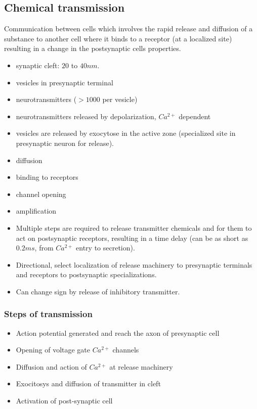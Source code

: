 \documentclass[main]{subfiles}
\begin{document}
\subsection{Chemical transmission}
Communication between cells which involves the rapid release and diffusion of a substance to another cell where it binds to a receptor (at a localized site) resulting in a change in the postsynaptic cells properties.

\begin{itemize}
\item synaptic cleft: $20$ to $40nm$.
\item vesicles in presynaptic terminal
\item neurotransmitters ($>1000$ per vesicle)
\item neurotransmitters released by depolarization, $Ca^{2+}$ dependent
\item vesicles are released by exocytose in the active zone (specialized site in presynaptic neuron for release).
\item diffusion
\item binding to receptors
\item channel opening
\item amplification
\item Multiple steps are required to release transmitter chemicals and for them to act on postsynaptic receptors, resulting in a time delay (can be as short as $0.2 ms$, from $Ca^{2+}$ entry to secretion).
\item Directional, select localization of release machinery to presynaptic terminals and receptors to postsynaptic specializations. 
\item Can change sign by release of inhibitory transmitter.
\end{itemize}

\subsubsection{Steps of transmission}
\begin{itemize}
\item Action potential generated and reach the axon of presynaptic cell
\item Opening of voltage gate $Ca^{2+}$ channels
\item Diffusion and action of $Ca^{2+}$ at release machinery
\item Exocitosys and diffusion of transmitter in cleft
\item Activation of post-synaptic cell
\end{itemize}
\end{document}
